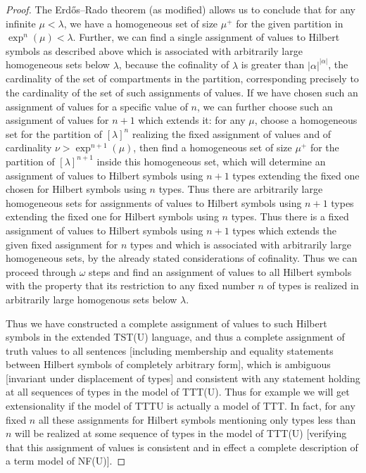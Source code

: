 \documentclass{article}
\newif\ifshowannotations
\newcommand{\abf}{\ifshowannotations\bf\fi}
\theoremstyle{definition}
\theoremstyle{remark}
\begin{document}
{\begin{proof}
The Erd\H{o}s--Rado theorem ({\abf as modified}) allows us to conclude that for any infinite $\mu<\lambda$, we have a homogeneous set of size $\mu^+$ for the given partition in $\exp^n(\mu)<\lambda$.
Further, we can find a single assignment of values to Hilbert symbols as described above which is associated with arbitrarily large homogeneous sets below $\lambda$, because the cofinality of $\lambda$ is greater than $|\alpha|^{|\alpha|}$, the cardinality of the set of compartments in the partition, corresponding precisely to the cardinality of the set of such assignments of values.
If we have chosen such an assignment of values for a specific value of $n$, we can further choose such an assignment of values for $n+1$ which extends it:  for any $\mu$, choose a homogeneous set for the partition of $[\lambda]^n$ realizing the fixed assignment of values and of cardinality $\nu > \exp^{n+1}(\mu)$, then find a homogeneous set of size $\mu^+$ for the partition of $[\lambda]^{n+1}$ inside this homogeneous set, which will determine an assignment of values to Hilbert symbols using $n+1$ types extending the fixed one chosen for Hilbert symbols using $n$ types.  Thus there are arbitrarily large homogeneous sets for
assignments of values to Hilbert symbols using $n+1$ types extending the fixed one for Hilbert symbols using $n$ types.  Thus there is a fixed assignment of values to Hilbert symbols using $n+1$ types which extends the given fixed assignment for $n$ types and which is associated with arbitrarily large homogeneous sets, by the already stated considerations of cofinality.  Thus we can proceed through $\omega$ steps and find an assignment of values to all Hilbert symbols with the property that its restriction to any fixed number $n$ of types is realized in arbitrarily large homogenous sets below $\lambda$.

Thus we have constructed a complete assignment of values to such Hilbert symbols in the extended TST(U) language, and thus a complete assignment of truth values to all sentences {\abf [including membership and equality statements between Hilbert symbols of completely arbitrary form]}, which is ambiguous [invariant under displacement of types] and consistent with any statement holding at all sequences of types in the model of TTT(U).  Thus for example we will get extensionality if the model of TTTU is actually a model of TTT.   In fact, for any fixed $n$ all these assignments for Hilbert symbols mentioning only types less than $n$ will be realized at some sequence of types in the model of TTT(U) [verifying that this assignment of values is consistent and in effect a complete description of a term model of NF(U)].


\end{proof}}
\end{document}
